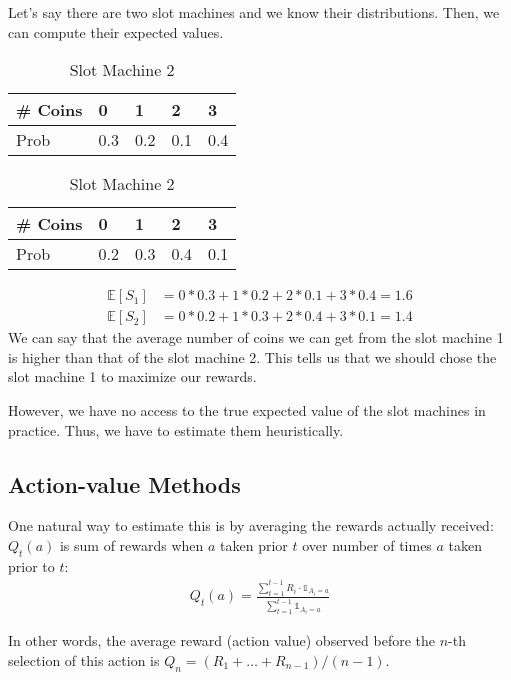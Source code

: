 Let's say there are two slot machines and we know their distributions. Then, we can compute their expected values.
\begin{table}[h]
\begin{minipage}{0.5\textwidth}
\centering
\begin{tabular}{lllll}
\toprule
\# Coins & 0   & 1   & 2   & 3  \\
\midrule
Prob     & 0.3 & 0.2 & 0.1 & 0.4\\
\bottomrule
\end{tabular}
\caption{Slot Machine 1}
\end{minipage}%
\begin{minipage}{0.5\textwidth}
\centering
\begin{tabular}{lllll}
\toprule
\# Coins & 0   & 1   & 2   & 3  \\
\midrule
Prob     & 0.2 & 0.3 & 0.4 & 0.1\\
\bottomrule
\end{tabular}
\caption{Slot Machine 2}
\end{minipage}
\end{table}
\begin{align*}
	\mathbb{E}[S_1]&= 0*0.3+1*0.2+2*0.1+3*0.4 = 1.6 \\
	\mathbb{E}[S_2]&= 0*0.2+1*0.3+2*0.4+3*0.1 = 1.4
\end{align*}
We can say that the average number of coins we can get from the slot machine 1 is higher than that of the slot machine 2. This tells us that we should chose the slot machine 1 to maximize our rewards. 

However, we have no access to the true expected value of the slot machines in practice. Thus, we have to estimate them heuristically. 

\subsection{Action-value Methods}

One natural way to estimate this is by averaging the rewards actually received: $Q_t(a)$ is sum of rewards when $a$ taken prior $t$ over number of times $a$ taken prior to $t$:
\begin{align*}
	Q_t(a) = \frac{\sum_{t=1}^{t-1}R_i \cdot \mathds{1}_{A_i=a}}{\sum_{t=1}^{t-1}\mathds{1}_{A_i=a}}
\end{align*}

In other words, the average reward (action value) observed before the $n$-th selection of this action is $Q_n = (R_1+\dots+R_{n-1})/(n-1)$. %

